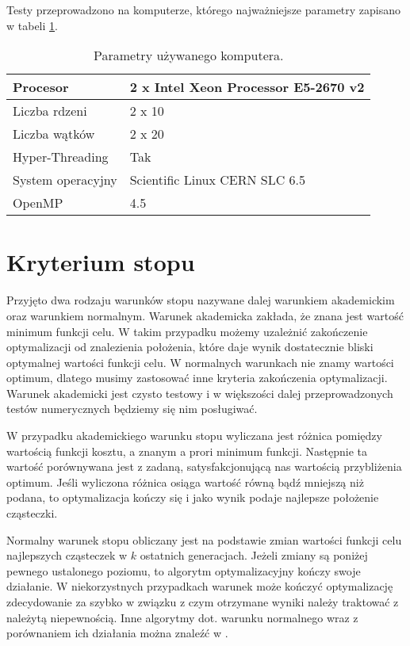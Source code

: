 \documentclass[11pt, a4paper, oneside]{article}
\begin{document}
Testy przeprowadzono na komputerze, którego najważniejsze parametry zapisano w tabeli \ref{tab:parametry}.

\begin{table}[h]
\begin{tabular}{|l|l|}
\hline
Procesor          & 2 x Intel Xeon Processor E5-2670 v2 \\ \hline
Liczba rdzeni     & 2 x 10                              \\ \hline
Liczba wątków     & 2 x 20                              \\ \hline
Hyper-Threading   & Tak                                 \\ \hline
System operacyjny & Scientific Linux CERN SLC 6.5       \\ \hline
OpenMP			  & 4.5							        \\ \hline
\end{tabular}
\caption{Parametry używanego komputera.}
\label{tab:parametry}
\end{table}

\section{Kryterium stopu} \label{sec:stop}

Przyjęto dwa rodzaju warunków stopu nazywane dalej warunkiem akademickim oraz warunkiem normalnym. Warunek akademicka zakłada, że znana jest wartość minimum funkcji celu. W takim przypadku możemy uzależnić zakończenie optymalizacji od znalezienia położenia, które daje wynik dostatecznie bliski optymalnej wartości funkcji celu. W normalnych warunkach nie znamy wartości optimum, dlatego musimy zastosować inne kryteria zakończenia optymalizacji. Warunek akademicki jest czysto testowy i w większości dalej przeprowadzonych testów numerycznych będziemy się nim posługiwać.

W przypadku akademickiego warunku stopu wyliczana jest różnica pomiędzy wartością funkcji kosztu, a znanym a prori minimum funkcji. Następnie ta wartość porównywana jest z zadaną, satysfakcjonującą nas wartością przybliżenia optimum. Jeśli wyliczona różnica osiąga wartość równą bądź mniejszą niż podana, to optymalizacja kończy się i jako wynik podaje najlepsze położenie cząsteczki.

Normalny warunek stopu obliczany jest na podstawie zmian wartości funkcji celu najlepszych cząsteczek w $k$ ostatnich generacjach. Jeżeli zmiany są poniżej pewnego ustalonego poziomu, to algorytm optymalizacyjny kończy swoje działanie. W niekorzystnych przypadkach warunek może kończyć optymalizację zdecydowanie za szybko w związku z czym otrzymane wyniki należy traktować z należytą niepewnością. Inne algorytmy dot. warunku normalnego wraz z porównaniem ich działania można znaleźć w \cite{karinZielinski}.
\end{document}
